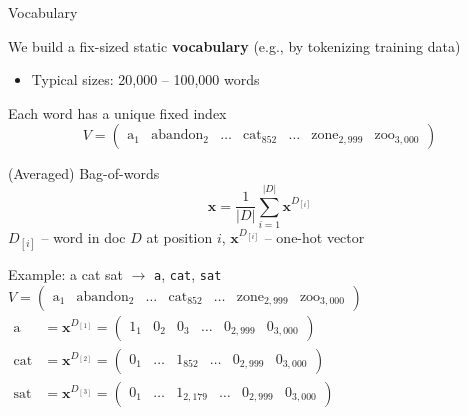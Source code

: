 \documentclass[12pt,aspectratio=169,handout]{beamer}
\begin{document}
\begin{frame}{Vocabulary}

We build a fix-sized static \textbf{vocabulary} (e.g., by tokenizing training data)

\begin{itemize}
	\item Typical sizes: 20,000 -- 100,000 words
\end{itemize}

\bigskip

Each word has a unique fixed index
$$
V = \begin{pmatrix}
\text{a}_1 & \text{abandon}_2 & \ldots & \text{cat}_{852} & \ldots & \text{zone}_{2,999} & \text{zoo}_{3,000}
\end{pmatrix}
$$

\end{frame}

\begin{frame}{(Averaged) Bag-of-words}
$$
\bm{x} = \frac{1}{|D|} \sum_{i =1}^{|D|} \bm{x}^{D_{[i]}}
$$
$D_{[i]}$ -- word in doc $D$ at position $i$, $\bm{x}^{D_{[i]}}$ -- one-hot vector

\begin{block}{Example: a cat sat $\to$ \texttt{a}, \texttt{cat}, \texttt{sat}}
$
V = \begin{pmatrix}
	\text{a}_1 & \text{abandon}_2 & \ldots & \text{cat}_{852} & \ldots & \text{zone}_{2,999} & \text{zoo}_{3,000}
\end{pmatrix}
$
$
\begin{aligned}
\text{a} & = \bm{x}^{D_{[1]}} =
\begin{pmatrix}
1_1 & 0_2 & 0_3 & \ldots & 0_{2,999} & 0_{3,000}
\end{pmatrix} \\
\text{cat} &= \bm{x}^{D_{[2]}} =
\begin{pmatrix}
0_1 & \ldots & 1_{852} & \ldots & 0_{2,999} & 0_{3,000}
\end{pmatrix} \\
\text{sat} &= \bm{x}^{D_{[3]}} =
\begin{pmatrix}
0_1 & \ldots & 1_{2,179} & \ldots & 0_{2,999} & 0_{3,000}
\end{pmatrix}
\end{aligned}
$



	
\end{block}

	
\end{frame}
\end{document}
